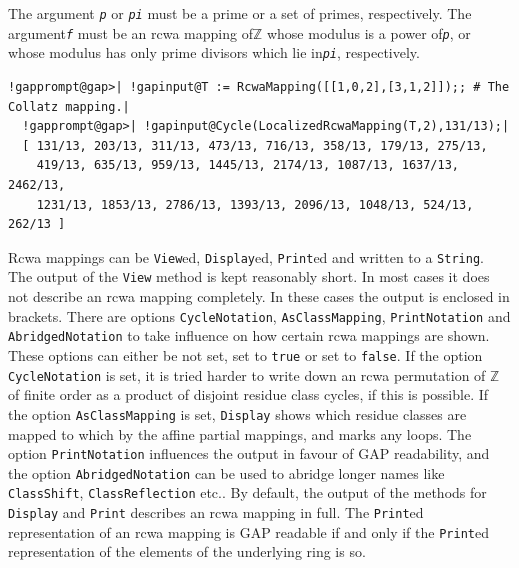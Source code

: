 \documentclass[a4paper,11pt]{report}
\begin{document}
{{{ The argument \mbox{\texttt{\mdseries\slshape p}} or \mbox{\texttt{\mdseries\slshape pi}} must be a prime or a set of primes, respectively. The argument{\nobreakspace}\mbox{\texttt{\mdseries\slshape f}} must be an rcwa mapping of{\nobreakspace}{\ensuremath{\mathbb Z}} whose
modulus is a power of{\nobreakspace}\mbox{\texttt{\mdseries\slshape p}}, or whose modulus has only prime divisors which lie in{\nobreakspace}\mbox{\texttt{\mdseries\slshape pi}}, respectively. 
\begin{Verbatim}[commandchars=!@|,fontsize=\small,frame=single,label=Example]
  !gapprompt@gap>| !gapinput@T := RcwaMapping([[1,0,2],[3,1,2]]);; # The Collatz mapping.|
  !gapprompt@gap>| !gapinput@Cycle(LocalizedRcwaMapping(T,2),131/13);|
  [ 131/13, 203/13, 311/13, 473/13, 716/13, 358/13, 179/13, 275/13, 
    419/13, 635/13, 959/13, 1445/13, 2174/13, 1087/13, 1637/13, 2462/13, 
    1231/13, 1853/13, 2786/13, 1393/13, 2096/13, 1048/13, 524/13, 262/13 ]
\end{Verbatim}
 }

     \noindent Rcwa mappings can be \texttt{View}ed, \texttt{Display}ed, \texttt{Print}ed and written to a \texttt{String}. The output of the \texttt{View} method is kept reasonably short. In most cases it does not describe an rcwa
mapping completely. In these cases the output is enclosed in brackets. There
are options \texttt{CycleNotation}, \texttt{AsClassMapping}, \texttt{PrintNotation} and \texttt{AbridgedNotation} to take influence on how certain rcwa mappings are shown. These options can
either be not set, set to \texttt{true} or set to \texttt{false}. If the option \texttt{CycleNotation} is set, it is tried harder to write down an rcwa permutation of
{\ensuremath{\mathbb Z}} of finite order as a product of disjoint residue
class cycles, if this is possible. If the option \texttt{AsClassMapping} is set, \texttt{Display} shows which residue classes are mapped to which by the affine partial
mappings, and marks any loops. The option \texttt{PrintNotation} influences the output in favour of \textsf{GAP} \texttt{} readability, and the option \texttt{AbridgedNotation} can be used to abridge longer names like \texttt{ClassShift}, \texttt{ClassReflection} etc.. By default, the output of the methods for \texttt{Display} and \texttt{Print} describes an rcwa mapping in full. The \texttt{Print}ed representation of an rcwa mapping is \textsf{GAP} \texttt{} readable if and only if the \texttt{Print}ed representation of the elements of the underlying ring is so. 

}}
\end{document}
